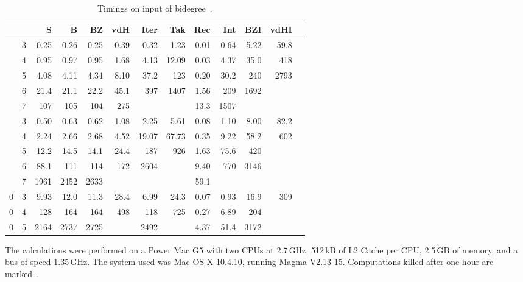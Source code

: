 \documentclass{sig-alt-full}
\begin{document}
\begin{table}[ht]
\begin{small}
\begin{center}
\setlength{\tabcolsep}{2.25pt}
\begin{tabular}{rr|rrr|rrr|rrrrr}
 &  & S & B & BZ & vdH & Iter & Tak & Rec & Int & BZI & vdHI \\
\hline
 & 3 & 0.25 & 0.26 & 0.25 & 0.39 & 0.32 & 1.23 & 0.01 & 0.64 & 5.22 & 59.8 \\
 & 4 & 0.95 & 0.97 & 0.95 & 1.68 & 4.13 & 12.09 & 0.03 & 4.37 & 35.0 & 418 \\
 & 5 & 4.08 & 4.11 & 4.34 & 8.10 & 37.2 & 123 & 0.20 & 30.2 & 240 & 2793 \\
 & 6 & 21.4 & 21.1 & 22.2 & 45.1 & 397 & 1407 & 1.56 & 209 & 1692 &  \\
 & 7 & 107 & 105 & 104 & 275 &  &  & 13.3 & 1507 &  &  \\
\hline
 & 3 & 0.50 & 0.63 & 0.62 & 1.08 & 2.25 & 5.61 & 0.08 & 1.10 & 8.00 & 82.2 \\
 & 4 & 2.24 & 2.66 & 2.68 & 4.52 & 19.07 & 67.73 & 0.35 & 9.22 & 58.2 & 602 \\
 & 5 & 12.2 & 14.5 & 14.1 & 24.4 & 187 & 926 & 1.63 & 75.6 & 420 &  \\
 & 6 & 88.1 & 111 & 114 & 172 & 2604 &  & 9.40 & 770 & 3146 &  \\
 & 7 & 1961 & 2452 & 2633 &  &  &  & 59.1 &  &  &  \\
\hline
0 & 3 & 9.93 & 12.0 & 11.3 & 28.4 & 6.99 & 24.3 & 0.07 & 0.93 & 16.9 & 309 \\
0 & 4 & 128 & 164 & 164 & 498 & 118 & 725 & 0.27 & 6.89 & 204 &  \\
0 & 5 & 2164 & 2737 & 2725 &  & 2492 &  & 4.37 & 51.4 & 3172 & 
\end{tabular}
\caption{\label{table:exp}Timings on input of bidegree~.}
\end{center}
\end{small}
\end{table}
\vskip-7pt

The calculations were performed on a Power Mac G5 with two CPUs at 2.7\,GHz, 512\,kB of L2 Cache per CPU, 2.5\,GB of memory, and a bus of speed 1.35\,GHz.
The system used was Mac OS X 10.4.10, running Magma V2.13-15.
Computations killed after one hour are marked~.
\end{document}
